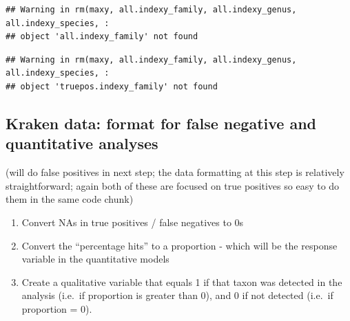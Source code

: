 \documentclass[
]{article}
\providecommand{\tightlist}{%
  \setlength{\itemsep}{0pt}\setlength{\parskip}{0pt}}
\begin{document}
\begin{verbatim}
## Warning in rm(maxy, all.indexy_family, all.indexy_genus, all.indexy_species, :
## object 'all.indexy_family' not found
\end{verbatim}

\begin{verbatim}
## Warning in rm(maxy, all.indexy_family, all.indexy_genus, all.indexy_species, :
## object 'truepos.indexy_family' not found
\end{verbatim}

\hypertarget{kraken-data-format-for-false-negative-and-quantitative-analyses}{%
\subsection{Kraken data: format for false negative and quantitative
analyses}\label{kraken-data-format-for-false-negative-and-quantitative-analyses}}

(will do false positives in next step; the data formatting at this step
is relatively straightforward; again both of these are focused on true
positives so easy to do them in the same code chunk)

\begin{enumerate}
\def\labelenumi{\arabic{enumi}.}
\tightlist
\item
  Convert NAs in true positives / false negatives to 0s
\item
  Convert the ``percentage hits'' to a proportion - which will be the
  response variable in the quantitative models
\item
  Create a qualitative variable that equals 1 if that taxon was detected
  in the analysis (i.e.~if proportion is greater than 0), and 0 if not
  detected (i.e.~if proportion = 0).
\end{enumerate}
\end{document}
